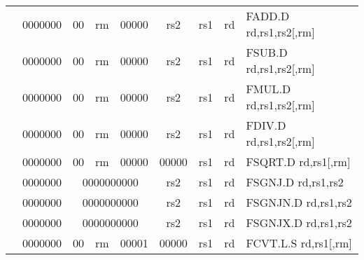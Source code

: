 \begin{table}[p]
\begin{small}
\begin{center}
\begin{tabular}{rcccccccccl}
&
\multicolumn{1}{|c|}{0000000} &
\multicolumn{1}{c|}{00} &
\multicolumn{2}{c|}{rm} &
\multicolumn{2}{c|}{00000} &
\multicolumn{1}{c|}{rs2} &
\multicolumn{1}{c|}{rs1} &
\multicolumn{1}{c|}{rd} & FADD.D rd,rs1,rs2[,rm] \\
\cline{2-10}
  

&
\multicolumn{1}{|c|}{0000000} &
\multicolumn{1}{c|}{00} &
\multicolumn{2}{c|}{rm} &
\multicolumn{2}{c|}{00000} &
\multicolumn{1}{c|}{rs2} &
\multicolumn{1}{c|}{rs1} &
\multicolumn{1}{c|}{rd} & FSUB.D rd,rs1,rs2[,rm] \\
\cline{2-10}
  

&
\multicolumn{1}{|c|}{0000000} &
\multicolumn{1}{c|}{00} &
\multicolumn{2}{c|}{rm} &
\multicolumn{2}{c|}{00000} &
\multicolumn{1}{c|}{rs2} &
\multicolumn{1}{c|}{rs1} &
\multicolumn{1}{c|}{rd} & FMUL.D rd,rs1,rs2[,rm] \\
\cline{2-10}
  

&
\multicolumn{1}{|c|}{0000000} &
\multicolumn{1}{c|}{00} &
\multicolumn{2}{c|}{rm} &
\multicolumn{2}{c|}{00000} &
\multicolumn{1}{c|}{rs2} &
\multicolumn{1}{c|}{rs1} &
\multicolumn{1}{c|}{rd} & FDIV.D rd,rs1,rs2[,rm] \\
\cline{2-10}
  

&
\multicolumn{1}{|c|}{0000000} &
\multicolumn{1}{c|}{00} &
\multicolumn{2}{c|}{rm} &
\multicolumn{2}{c|}{00000} &
\multicolumn{1}{c|}{00000} &
\multicolumn{1}{c|}{rs1} &
\multicolumn{1}{c|}{rd} & FSQRT.D rd,rs1[,rm] \\
\cline{2-10}
  

&
\multicolumn{1}{|c|}{0000000} &
\multicolumn{5}{c|}{0000000000} &
\multicolumn{1}{c|}{rs2} &
\multicolumn{1}{c|}{rs1} &
\multicolumn{1}{c|}{rd} & FSGNJ.D rd,rs1,rs2 \\
\cline{2-10}
  

&
\multicolumn{1}{|c|}{0000000} &
\multicolumn{5}{c|}{0000000000} &
\multicolumn{1}{c|}{rs2} &
\multicolumn{1}{c|}{rs1} &
\multicolumn{1}{c|}{rd} & FSGNJN.D rd,rs1,rs2 \\
\cline{2-10}
  

&
\multicolumn{1}{|c|}{0000000} &
\multicolumn{5}{c|}{0000000000} &
\multicolumn{1}{c|}{rs2} &
\multicolumn{1}{c|}{rs1} &
\multicolumn{1}{c|}{rd} & FSGNJX.D rd,rs1,rs2 \\
\cline{2-10}
  

&
\multicolumn{1}{|c|}{0000000} &
\multicolumn{1}{c|}{00} &
\multicolumn{2}{c|}{rm} &
\multicolumn{2}{c|}{00001} &
\multicolumn{1}{c|}{00000} &
\multicolumn{1}{c|}{rs1} &
\multicolumn{1}{c|}{rd} & FCVT.L.S rd,rs1[,rm] \\
\cline{2-10}
  


\end{tabular}
\end{center}
\end{small}
\end{table}
